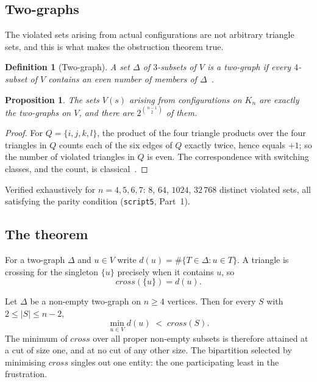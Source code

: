 \documentclass[11pt,a4paper]{article}
\def\mathrm#1{#1}%
\def\mathcal#1{#1}%
\newtheorem{proposition}[theorem]{Proposition}
\newtheorem{definition}[theorem]{Definition}
\newcommand{\Kn}{K_n}
\newcommand{\cross}{\mathrm{cross}}
\newcommand{\dtg}{d}
\begin{document}
\subsection{Two-graphs}

The violated sets arising from actual configurations are not arbitrary triangle sets, and this is what makes the obstruction theorem true.

\begin{definition}[Two-graph]
A set $\Delta$ of $3$-subsets of $V$ is a \emph{two-graph} if every $4$-subset of $V$ contains an even number of members of $\Delta$~\citep{Seidel1976,Taylor1977}.
\end{definition}

\begin{proposition}
\label{prop:twograph}
The sets $\mathcal{V}(s)$ arising from configurations on $\Kn$ are exactly the two-graphs on $V$, and there are $2^{\binom{n-1}{2}}$ of them.
\end{proposition}

\begin{proof}
For $Q=\{i,j,k,l\}$, the product of the four triangle products over the four triangles in $Q$ counts each of the six edges of $Q$ exactly twice, hence equals $+1$; so the number of violated triangles in $Q$ is even. The correspondence with switching classes, and the count, is classical~\citep{Seidel1976}.
\end{proof}

Verified exhaustively for $n=4,5,6,7$: $8$, $64$, $1024$, $32\,768$ distinct violated sets, all satisfying the parity condition (\texttt{script5}, Part~1).

\subsection{The theorem}

For a two-graph $\Delta$ and $u\in V$ write $\dtg(u)=\#\{T\in\Delta:u\in T\}$. A triangle is crossing for the singleton $\{u\}$ precisely when it contains $u$, so
\begin{equation}
\cross(\{u\})=\dtg(u).
\label{eq:singleton}
\end{equation}

\begin{theorembox}
Let $\Delta$ be a non-empty two-graph on $n\ge4$ vertices. Then for every $S$ with $2\le|S|\le n-2$,
\[
\min_{u\in V}\dtg(u)\;<\;\cross(S).
\]
The minimum of $\cross$ over all proper non-empty subsets is therefore attained at a cut of size one, and at no cut of any other size. The bipartition selected by minimising $\cross$ singles out one entity: the one participating least in the frustration.
\end{theorembox}
\end{document}
